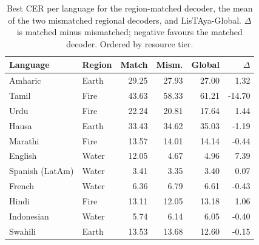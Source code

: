 \begin{table}[t]
\centering
\setlength{\tabcolsep}{4pt}
\begin{tabular}{@{}llrrrr@{}}
\toprule
\textbf{Language} & \textbf{Region} & \textbf{Match} & \textbf{Mism.} & \textbf{Global} & \textbf{$\Delta$} \\
\midrule
Amharic & Earth & 29.25 & 27.93 & 27.00 & 1.32 \\
Tamil & Fire & 43.63 & 58.33 & 61.21 & -14.70 \\
Urdu & Fire & 22.24 & 20.81 & 17.64 & 1.44 \\
Hausa & Earth & 33.43 & 34.62 & 35.03 & -1.19 \\
Marathi & Fire & 13.57 & 14.01 & 14.14 & -0.44 \\
English & Water & 12.05 & 4.67 & 4.96 & 7.39 \\
Spanish (LatAm) & Water & 3.41 & 3.35 & 3.40 & 0.07 \\
French & Water & 6.36 & 6.79 & 6.61 & -0.43 \\
Hindi & Fire & 13.11 & 12.05 & 13.18 & 1.06 \\
Indonesian & Water & 5.74 & 6.14 & 6.05 & -0.40 \\
Swahili & Earth & 13.53 & 13.68 & 12.60 & -0.15 \\
\bottomrule
\end{tabular}
\caption{Best CER per language for the region-matched decoder, the mean of the two mismatched regional decoders, and LisTAya-Global. $\Delta$ is matched minus mismatched; negative favours the matched decoder. Ordered by resource tier.}
\label{tab:region-match}
\end{table}
